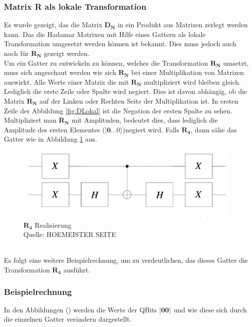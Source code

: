 \subsubsection{Matrix R als lokale Transformation}
Es wurde gezeigt, das die Matrix $\mathbf{D_N}$ in ein Produkt aus Matrizen zerlegt werden kann. Das die Hadamar Matrixen mit Hilfe eines Gattern als lokale Transformation umgesetzt werden können ist bekannt. Dies muss jedoch auch noch für $\mathbf{R_N}$ gezeigt werden. 
\\
Um ein Gatter zu entwickeln zu können, welches die Transformation $\mathbf{R_N}$ umsetzt, muss sich angeschaut werden wie sich $\mathbf{R_N}$ bei einer Multiplikation von Matrizen auswirkt. Alle Werte einer Matrix die mit $\mathbf{R_N}$ multipliziert wird bleiben gleich. Lediglich die erste Zeile oder Spalte wird negiert. Dies ist davon abhängig, ob die Matrix $\mathbf{R_N}$ auf der Linken oder Rechten Seite der Multiplikation ist. In ersten Zeile der Abbildung \ref{fig:DLokal} ist die Negation der ersten Spalte zu sehen.
\\
Multipliziert man $\mathbf{R_N}$ mit Amplituden, bedeutet dies, dass lediglich die Amplitude des ersten Elementes ($\mathbf{|0...0\rangle}$)negiert wird.
Falls $\mathbf{R_4}$, dann sähe das Gatter wie in Abbildung \ref{fig:Rgatter} aus.
 \begin{figure}[hbtp]
 	\centering
 	\includegraphics[width=.8\textwidth]{figures/rgatter.png}
 	\caption{$\mathbf{R_4}$ Realisierung \\ Quelle: HOEMEISTER SEITE}
 	\label{fig:Rgatter}
 \end{figure}
\\
Es folgt eine weitere Beispielrechnung, um zu verdeutlichen, das dieses Gatter die Transformation $\mathbf{R_4}$ ausführt.
\subsubsection{Beispielrechnung}
 In den Abbildungen () werden die Werte der QBits $\mathbf{|00\rangle}$ und wie diese sich durch die einzelnen Gatter verändern dargestellt.
 
